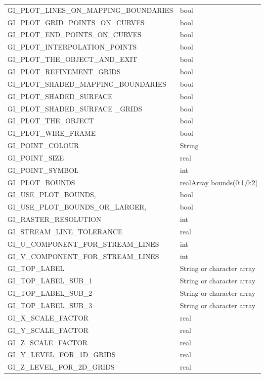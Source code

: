 \documentclass{article}
\begin{document}
\begin{supertabular}{|l|l|}
 GI\_PLOT\_LINES\_ON\_MAPPING\_BOUNDARIES        & bool \\
 GI\_PLOT\_GRID\_POINTS\_ON\_CURVES              & bool \\
 GI\_PLOT\_END\_POINTS\_ON\_CURVES              & bool \\
 GI\_PLOT\_INTERPOLATION\_POINTS                 &  bool  \\
 GI\_PLOT\_THE\_OBJECT\_AND\_EXIT                &  bool  \\
 GI\_PLOT\_REFINEMENT\_GRIDS                     & bool \\
 GI\_PLOT\_SHADED\_MAPPING\_BOUNDARIES               & bool \\
 GI\_PLOT\_SHADED\_SURFACE                       &  bool  \\
 GI\_PLOT\_SHADED\_SURFACE \_GRIDS               &  bool  \\
 GI\_PLOT\_THE\_OBJECT                           &  bool  \\
 GI\_PLOT\_WIRE\_FRAME                           &  bool  \\
 GI\_POINT\_COLOUR                          & String \\
 GI\_POINT\_SIZE                            & real   \\
 GI\_POINT\_SYMBOL                          & int    \\
 GI\_PLOT\_BOUNDS                           &  realArray bounds(0:1,0:2)  \\
 GI\_USE\_PLOT\_BOUNDS,                          &  bool \\
 GI\_USE\_PLOT\_BOUNDS\_OR\_LARGER,              &  bool \\
 GI\_RASTER\_RESOLUTION                     & int \\
 GI\_STREAM\_LINE\_TOLERANCE                & real \\
 GI\_U\_COMPONENT\_FOR\_STREAM\_LINES       &  int   \\
 GI\_V\_COMPONENT\_FOR\_STREAM\_LINES       &  int   \\
 GI\_TOP\_LABEL                                  &  String or character array  \\
 GI\_TOP\_LABEL\_SUB\_1                          &  String or character array  \\
 GI\_TOP\_LABEL\_SUB\_2                          &  String or character array  \\
 GI\_TOP\_LABEL\_SUB\_3                          &  String or character array  \\
 GI\_X\_SCALE\_FACTOR                        & real \\
 GI\_Y\_SCALE\_FACTOR                        & real \\
 GI\_Z\_SCALE\_FACTOR                        & real \\
 GI\_Y\_LEVEL\_FOR\_1D\_GRIDS                & real \\
 GI\_Z\_LEVEL\_FOR\_2D\_GRIDS                & real \\

\end{supertabular}
\end{document}
